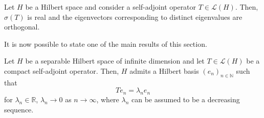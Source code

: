 \begin{proposition}
    Let \(H\) be a Hilbert space and consider a self-adjoint operator \(T\in \mathcal{L}(H)\). Then, \(\sigma(T)\) is real and the eigenvectors corresponding to distinct eigenvalues are orthogonal.
\end{proposition}
It is now possible to state one of the main results of this section.
\begin{theorem}\label{spectral_theorem}
    Let \(H\) be a separable Hilbert space of infinite dimension and let \(T \in \mathcal{L}(H)\) be a compact self-adjoint operator. Then, \(H\) admits a Hilbert basis \((e_n)_{n \in \mathbb{N}}\) such that
    \[
        T e_n = \lambda_n e_n
    \]
    for \(\lambda_n \in \mathbb{R}\), \(\lambda_n \rightarrow 0\) as \(n \rightarrow \infty\), where \(\lambda_n\) can be assumed to be a decreasing sequence.
\end{theorem}\label{fredholm_alt}

